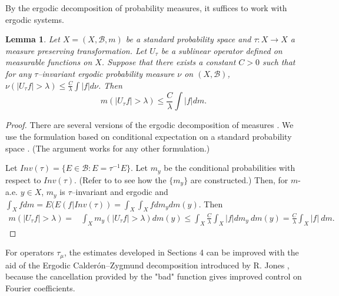 \documentclass[11pt]{amsart}
\newtheorem{lemma}[thm]{Lemma}
\theoremstyle{definition}
\theoremstyle{remark}
\begin{document}
By the ergodic decomposition of probability measures,
 it suffices to work with ergodic systems.
 
  \begin{lemma}\label{lem:ergo_decom} %
Let $X=(X,\mathcal B,m)$ be a standard probability space and $\tau:X\to X$ a measure preserving transformation. 
Let $U_{\tau}$ be a sublinear operator defined on measurable functions on $X$.
Suppose that there exists a constant $C>0$ such that for any $\tau$--invariant ergodic probability measure $\nu$ on $(X, \mathcal B)$,
$\nu\left(|U_{\tau}f|>\lambda \right) \le \frac C{\lambda} \int |f| d\nu$.
Then %
\[m\left(|U_{\tau}f|>\lambda \right) \le \frac C{\lambda} \int |f| dm.\]
\end{lemma}

\begin{proof}
There are several versions of the ergodic decomposition of measures \cite{Walters, CSF}. 
We use the formulation based on conditional expectation on a standard probability space \cite{Sarig}. (The argument works for any other formulation.)

Let $Inv(\tau)=\{E \in \mathcal B : E = \tau^{-1}E\}$. Let $m_y$ be the conditional probabilities with respect to $Inv(\tau)$. (Refer to \cite{Sarig} to see how the $\{m_y\}$ are constructed.)
Then, for $m$-a.e. $y\in X$, $m_y$ is $\tau$--invariant and ergodic and 
$\int_X f dm= E(E(f|Inv(\tau))=  \int_X \int_X f dm_y dm(y)$.
Then
\begin{align*}
m(|U_{\tau}f|>\lambda) 
 = & \int_X m_y\left(|U_{\tau}f|>\lambda \right) dm(y) 
\le  \int_X \frac C{\lambda} \int_X |f| dm_y \ dm(y)=\frac C{\lambda} \int_X |f|\ dm. 
\end{align*}
\end{proof}


For operators $\tau_{\mu}$, the estimates developed in Sections 4 can be improved with the aid of the Ergodic Calder\'on--Zygmund  decomposition introduced by R. Jones \cite{Roger}, because  the cancellation provided by the "bad" function gives improved control on Fourier coefficients.
\end{document}
